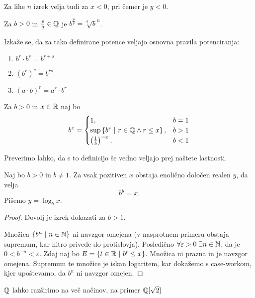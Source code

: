 \documentclass[12pt, a4paper]{article}
\begin{document}
\begin{opomba}
Za lihe $n$ izrek velja tudi za $x<0$, pri čemer je $y<0$.
\end{opomba}

\begin{definicija}
Za $b>0$ in $\frac{p}{q}\in\mathbb{Q}$ je $b^\frac{p}{q}=\sqrt[q]{b}^n$.
\end{definicija}

Izkaže se, da za tako definirane potence veljajo osnovna pravila potenciranja:

\begin{enumerate}[label=\arabic*)]
\item $b^r\cdot b^s=b^{r+s}$
\item $(b^r)^s=b^{rs}$
\item $(a\cdot b)^r=a^r\cdot b^r$
\end{enumerate}

\begin{definicija}
Za $b>0$ in $x\in\mathbb{R}$ naj bo 
\[
b^x=\begin{cases}
1, &b=1 \\
\sup\left\{b^r~\middle\vert~r\in\mathbb{Q}\land r\leq x\right\}, &b>1 \\
\left(\frac{1}{b}\right)^{-x}, &b<1
\end{cases}
\]
\end{definicija}

Preverimo lahko, da s to definicijo še vedno veljajo prej naštete lastnosti.

\begin{izrek}
Naj bo $b>0$ in $b\ne 1$. Za vsak pozitiven $x$ obstaja enolično določen realen $y$, da velja
\[
b^y=x.
\]
Pišemo $y=\log_b x$.
\end{izrek}

\begin{proof}
Dovolj je izrek dokazati za $b>1$.

Množica $\left\{b^n~\middle\vert~n\in\mathbb{N}\right\}$ ni navzgor omejena (v nasprotnem primeru obstaja supremum, kar hitro privede do protislovja). Posledično $\forall\varepsilon>0~\exists n\in\mathbb{N}$, da je $0<b^{-n}<\varepsilon$. Zdaj naj bo $E=\left\{t\in\mathbb{R}~\middle\vert~b^t\leq x\right\}$. Množica ni prazna in je navzgor omejena. Supremum te množice je iskan logaritem, kar dokažemo s case-workom, kjer upoštevamo, da $b^n$ ni navzgor omejen.
\end{proof}

\begin{opomba}
$\mathbb{Q}$ lahko razširimo na več načinov, na primer $\mathbb{Q}[\sqrt{2}]$
\end{opomba}
\end{document}
